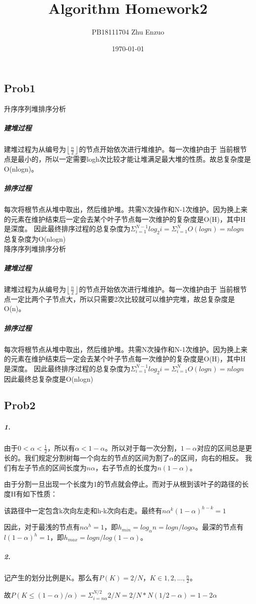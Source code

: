 \documentclass{ctexart}
\title{Algorithm Homework2}
\author{PB18111704 Zhu Enzuo}
\date{\today}
\begin{document}
\maketitle

\subsection{Prob1} 升序序列堆排序分析
\subparagraph{建堆过程}
    建堆过程为从编号为$\left \lfloor \frac{n}{2} \right \rfloor$的节点开始依次进行堆维护。每一次维护由于
    当前根节点是最小的，所以一定需要logh次比较才能让堆满足最大堆的性质。故总复杂度是O(nlogn)。
\subparagraph{排序过程}
    每次将根节点从堆中取出，然后维护堆。共需N次操作和N-1次维护。因为换上来的元素在维护结束后一定会去某个叶子节点每一次维护的复杂度是O(H)，其中H是深度。
    因此最终排序过程的总复杂度为$\Sigma_{i=1}^{N-1}log_{2}i=\Sigma_{i=1}^NO(logn)=nlogn$
    总复杂度为O(nlogn)\\

降序序列堆排序分析
\subparagraph{建堆过程}
    建堆过程为从编号为$\left \lfloor \frac{n}{2} \right \rfloor$的节点开始依次进行堆维护。每一次维护由于
    当前根节点一定比两个子节点大，所以只需要2次比较就可以维护完堆，故总复杂度是O(n)。
\subparagraph{排序过程}
    每次将根节点从堆中取出，然后维护堆。共需N次操作和N-1次维护。因为换上来的元素在维护结束后一定会去某个叶子节点每一次维护的复杂度是O(H)，其中H是深度。
    因此最终排序过程的总复杂度为$\Sigma_{i=1}^{N-1}log_{2}i=\Sigma_{i=1}^NO(logn)=nlogn$ \\
    因此最终总复杂度是O(nlogn)

\subsection{Prob2}
\subparagraph{1.}由于$0<\alpha<\frac{1}{2}$，所以有$\alpha<1-\alpha$。所以对于每一次分割，$1-\alpha$对应的区间总是更长的。我们规定分割树每一个向左的节点的区间为割了$\alpha$的区间，向右的相反。
我们有左子节点的区间长度为$n\alpha$，右子节点的长度为$n(1-\alpha)$。

由于分割一旦出现一个长度为1的节点就会停止。而对于从根到该叶子的路径的长度H有如下性质：

该路径中一定包含k次向左走和h-k次向右走。最终有$n\alpha^k(1-\alpha)^{h-k}=1$

因此，对于最浅的节点有$n\alpha^h=1$，即$h_{min}=log_{\alpha}n=logn/log\alpha$。最深的节点有$l(1-\alpha)^h=1$，即$h_{max}=logn/log(1-\alpha)$。
\subparagraph{2.}记产生的划分比例是K。那么有$P(K)=2/N，K\in {1,2,...,\frac{n}{2}}$。

故$P(K \le (1-\alpha)/\alpha )=\Sigma_{i=n\alpha}^{N/2}2/N=2/N*N(1/2-\alpha)=1-2\alpha$
\end{document}
